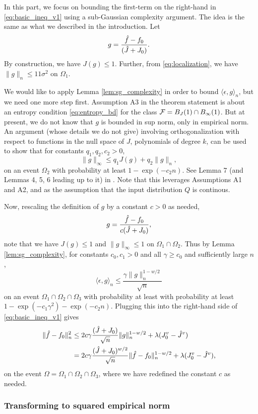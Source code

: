 \documentclass{article}
\begin{document}
In this part, we focus on bounding the first-term on the right-hand in
\eqref{eq:basic_ineq_v1} using a sub-Gaussian complexity argument. The idea is
the same as what we described in the introduction. Let
\[
g = \frac{\hat{f}-f_0}{({\hat J} + J_0)}.
\]
By construction, we have $J(g) \leq 1$. Further, from \eqref{eq:localization},
we have $\|g\|_n \leq 11\sigma^2$ on $\Omega_1$.  

We would like to apply Lemma \ref{lem:sg_complexity} in order to bound $\langle 
\epsilon, g \rangle_n$, but we need one more step first. Assumption A3 in the
theorem statement is about an entropy condition \eqref{eq:entropy_bd} for the
class $\mathcal{F} = B_J(1) \cap B_\infty(1)$. But at present, we do not know that $g$
is bounded in sup norm, only in empirical norm. An argument (whose details we do
not give) involving orthogonalization with respect to functions in the null
space of $J$, polynomials of degree $k$, can be used to show that for constants
$q_1,q_2,c_2>0$,
\[
\|g\|_\infty \leq q_1 J(g) + q_2 \|g\|_n,
\]
on an event $\Omega_2$ with probability at least $1-\exp(-c_2 n)$. See Lemma 7
(and Lemmas 4, 5, 6 leading up to it) in \citet{sadhanala2019additive}. Note
that this leverages Assumptions A1 and A2, and as the assumption that the input  
distribution $Q$ is continous.   

Now, rescaling the definition of $g$ by a constant $c>0$ as needed, 
\[
g = \frac{\hat{f}-f_0}{c({\hat J} + J_0)},
\]
note that we have $J(g) \leq 1$ and $\|g\|_\infty \leq 1$ on $\Omega_1 \cap
\Omega_2$. Thus by Lemma \ref{lem:sg_complexity}, for constants $c_0,c_1>0$ and 
all $\gamma \geq c_0$ and sufficiently large $n$,  
\[
\langle \epsilon, g \rangle_n \leq \frac{\gamma \|g\|_n^{1-w/2}}{\sqrt n} 
\]
on an event $\Omega_1 \cap \Omega_2 \cap \Omega_3$ with probability at least 
with probability at least $1 - \exp(-c_1\gamma^2) - \exp(-c_2n)$. Plugging this 
into the right-hand side of \eqref{eq:basic_ineq_v1} gives 
\begin{align}
\nonumber
\|\hat{f} - f_0\|_n^2 &\leq 2c \gamma \frac{({\hat J} + J_0)}{\sqrt n}
 \|g\|_n^{1-w/2} + \lambda (J_0^v - {\hat J}^v) \\ 
\label{eq:basic_ineq_v2}
&= 2c \gamma \frac{({\hat J} + J_0)^{w/2}}{\sqrt n} \|\hat{f}-f_0\|_n^{1-w/2} +
  \lambda (J_0^v - {\hat J}^v), 
\end{align} 
on the event $\Omega = \Omega_1 \cap \Omega_2 \cap \Omega_3$, where we have
redefined the constant $c$ as needed.

\subsubsection{Transforming to squared empirical norm} 
\end{document}
